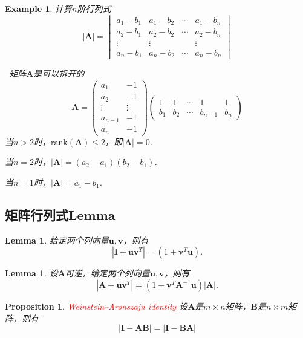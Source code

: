 \documentclass{article}
\newtheorem{lemma}[theorem]{Lemma}
\newtheorem{proposition}[theorem]{Proposition}
\newtheorem{example}[theorem]{Example}
\newcommand{\hints}{{\color{blue} \text{hints}}}
\newcommand{\mbf}[1]{\bm{#1}}
\newcommand{\rank}[1]{\text{rank}\left(#1\right)} %
\newcommand{\redt}[1]{\textcolor{red}{#1}}
\begin{document}
\begin{example}
\rm 计算$n$阶行列式
$$
|\mbf{A}| = 
\begin{vmatrix}
a_1 - b_1 & a_1 - b_2 & \cdots & a_1 - b_n \\
a_2 - b_1 & a_2 - b_2 & \cdots & a_2 - b_n \\
\vdots & \vdots && \vdots \\
a_n - b_1 & a_n - b_2 & \cdots & a_n - b_n
\end{vmatrix}
$$

\hints\ 矩阵$\mbf{A}$是可以拆开的
$$
\mbf{A} = \begin{pmatrix}
a_1 & -1 \\
a_2 & -1 \\
\vdots & \vdots \\
a_{n-1} & -1 \\
a_n  & -1 
\end{pmatrix} \begin{pmatrix}
1 & 1 & \cdots & 1 & 1\\ 
b_1 & b_2 & \cdots & b_{n-1} & b_n
\end{pmatrix}
$$
当$n > 2$时，$\rank{\mbf{A}} \leq 2$，即$|\mbf{A}| = 0$. 

当$n = 2$时，$|\mbf{A}| = (a_2 - a_1)(b_2 - b_1)$.

当$n = 1$时，$|\mbf{A}| = a_1 - b_1$. 
\end{example}

\subsection{矩阵行列式Lemma}

\begin{lemma}
\rm 给定两个列向量$\mbf{u},\mbf{v}$，则有
$$
|\mbf{I} + \mbf{u}\mbf{v}^{T}| = (1 + \mbf{v}^{T}\mbf{u}). 
$$
\end{lemma}

\begin{lemma}
\rm 设$\mbf{A}$可逆，给定两个列向量$\mbf{u},\mbf{v}$，则有
$$
|\mbf{A} + \mbf{u}\mbf{v}^{T}| = (1+\mbf{v}^{T}\mbf{A}^{-1}\mbf{u})|\mbf{A}|.
$$
\end{lemma}

\begin{proposition}\label{sylvester determinant}
\rm \redt{Weinstein–Aronszajn identity} 设$\mbf{A}$是$m \times n$矩阵，$\mbf{B}$是$n \times m$矩阵，则有
$$
|\mbf{I}-\mbf{A}\mbf{B}| = |\mbf{I}-\mbf{B}\mbf{A}|
$$
\end{proposition}
\end{document}
